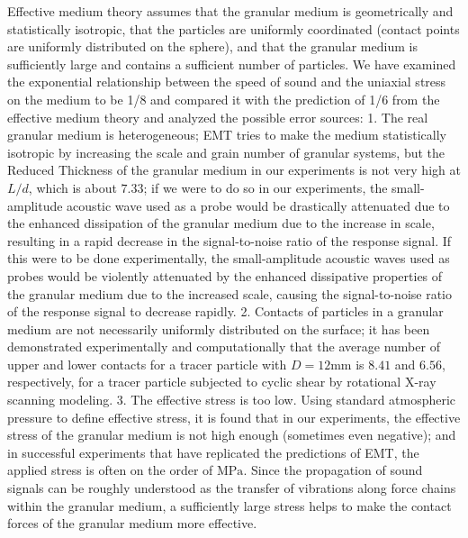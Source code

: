 \begin{digest}
    Effective medium theory assumes that the granular medium is geometrically and statistically isotropic, that the particles are uniformly coordinated (contact points are uniformly distributed on the sphere), and that the granular medium is sufficiently large and contains a sufficient number of particles. We have examined the exponential relationship between the speed of sound and the uniaxial stress on the medium to be 1/8 and compared it with the prediction of 1/6 from the effective medium theory and analyzed the possible error sources:
    1. The real granular medium is heterogeneous; EMT tries to make the medium statistically isotropic by increasing the scale and grain number of granular systems, but the Reduced Thickness of the granular medium in our experiments is not very high at $L/d$, which is about $7.33$; if we were to do so in our experiments, the small-amplitude acoustic wave used as a probe would be drastically attenuated due to the enhanced dissipation of the granular medium due to the increase in scale, resulting in a rapid decrease in the signal-to-noise ratio of the response signal. If this were to be done experimentally, the small-amplitude acoustic waves used as probes would be violently attenuated by the enhanced dissipative properties of the granular medium due to the increased scale, causing the signal-to-noise ratio of the response signal to decrease rapidly.
    2. Contacts of particles in a granular medium are not necessarily uniformly distributed on the surface; it has been demonstrated experimentally and computationally that the average number of upper and lower contacts for a tracer particle with $D=12\unit{\milli\meter}$ is $8.41$ and $6.56$, respectively, for a tracer particle subjected to cyclic shear by rotational X-ray scanning modeling. 
    3. The effective stress is too low. Using standard atmospheric pressure to define effective stress, it is found that in our experiments, the effective stress of the granular medium is not high enough (sometimes even negative); and in successful experiments that have replicated the predictions of EMT, the applied stress is often on the order of $\unit{\mega\pascal}$. Since the propagation of sound signals can be roughly understood as the transfer of vibrations along force chains within the granular medium, a sufficiently large stress helps to make the contact forces of the granular medium more effective.

    

\end{digest}
